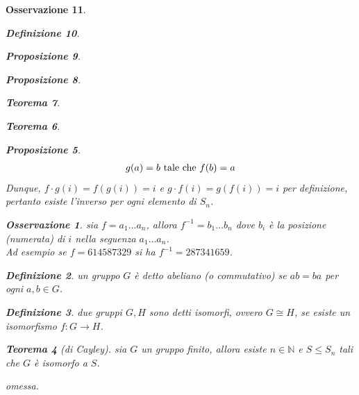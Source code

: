 \documentclass[oneside, 11pt]{amsbook}
\makeatletter
\newcommand{\0}{{(0)}}
\newcommand{\3}{{(3)}}
\theoremstyle{colonplain}
\newtheorem{thm}{Teorema}[chapter]
\newtheorem{prop}[thm]{Proposizione}
\theoremstyle{colondefinition}
\newtheorem{defn}[thm]{Definizione}
\theoremstyle{colonremark}
\newtheorem{rmk}[thm]{Osservazione}
\numberwithin{equation}{chapter}
\renewcommand{\proofname}{Dimostrazione}
\renewenvironment{proof}[1][\proofname]{\par
  \pushQED{\end{proof}}%
  \normalfont \topsep6\p@\@plus6\p@\relax
  \trivlist
  \item[\hskip\labelsep\bfseries #1:]\ignorespaces
}{%
  \popQED\endtrivlist\@endpefalse
}
\makeatother
\begin{document}
\begin{rmk}
\begin{defn}
\begin{prop}
\begin{prop}
\begin{thm}
\begin{thm}
\begin{prop}
\begin{proof}
\begin{align}
    g(a) = b \text{ tale che } f(b) = a \notag
\end{align}
Dunque, $f \cdot g (i) = f(g(i)) = i$ e $g \cdot f (i) = g(f(i)) = i$ per definizione, pertanto esiste l'inverso per ogni elemento di $S_n$.
\end{proof}
\begin{rmk}
sia $f = a_1 \dots a_n$, allora $f^{-1} = b_1 \dots b_n$ dove $b_i$ è la posizione (numerata) di $i$ nella seguenza $a_1 \dots a_n$. \\
Ad esempio se $f = 614587329$ si ha $f^{-1} = 287341659$.
\end{rmk}
\begin{defn}
un gruppo $G$ è detto \textit{abeliano} (o \textit{commutativo}) se $ab = ba$ per ogni $a, b \in G$.
\end{defn}
\begin{defn}
due gruppi $G, H$ sono detti \textit{isomorfi}, ovvero $G \cong H$, se esiste un isomorfismo $f : G \longrightarrow H$.
\end{defn}
\begin{thm}[di Cayley]
sia $G$ un gruppo finito, allora esiste $n \in \mathbb{N}$ e $S \leq S_n$ tali che $G$ è isomorfo a $S$.
\end{thm}
\begin{proof}
omessa.
\end{proof}


\end{prop}
\end{thm}
\end{thm}
\end{prop}
\end{prop}
\end{defn}
\end{rmk}
\end{document}
